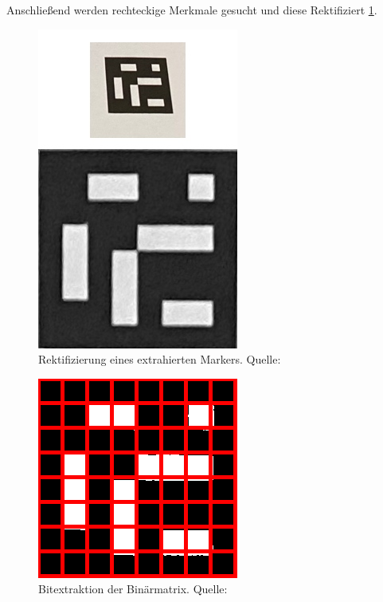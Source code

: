 Anschließend werden rechteckige Merkmale gesucht und diese Rektifiziert \ref{fig:aruco4}. 

\begin{figure}
    \caption{Rektifizierung eines extrahierten Markers. Quelle: \cite[OpenCV]{OpenCVaruco}}\label{fig:aruco4}
    \includegraphics[width = \textwidth/3]{Bilder/removeperspective.jpg}
    \centering
\end{figure}

\begin{figure}
    \caption{Bitextraktion der Binärmatrix. Quelle: \cite[OpenCV]{OpenCVaruco}}\label{fig:aruco5}
    \includegraphics{Bilder/bitsextraction1.png}
    \centering
\end{figure}

